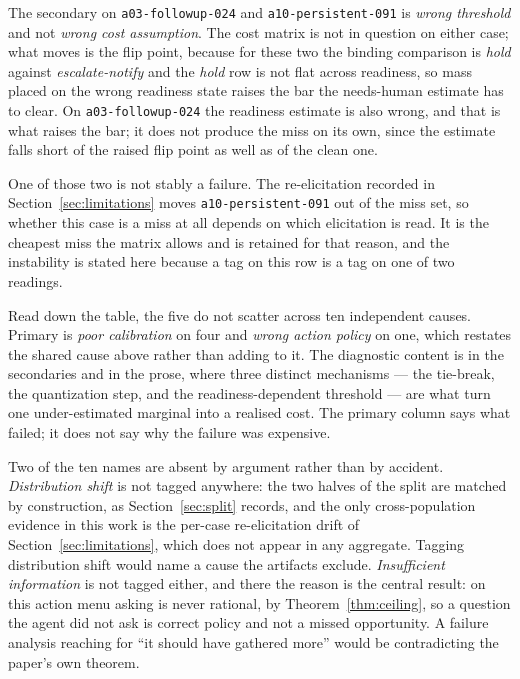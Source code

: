 \documentclass{article}
\begin{document}
The secondary on \texttt{a03-followup-024} and \texttt{a10-persistent-091} is
\emph{wrong threshold} and not \emph{wrong cost assumption}. The cost matrix is not
in question on either case; what moves is the flip point, because for these two the
binding comparison is \emph{hold} against \emph{escalate-notify} and the
\emph{hold} row is not flat across readiness, so mass placed on the wrong readiness
state raises the bar the needs-human estimate has to clear. On
\texttt{a03-followup-024} the readiness estimate is also wrong, and that is what
raises the bar; it does not produce the miss on its own, since the estimate falls
short of the raised flip point as well as of the clean one.

One of those two is not stably a failure. The re-elicitation recorded in
Section~\ref{sec:limitations} moves \texttt{a10-persistent-091} out of the miss
set, so whether this case is a miss at all depends on which elicitation is read. It
is the cheapest miss the matrix allows and is retained for that reason, and the
instability is stated here because a tag on this row is a tag on one of two
readings.

Read down the table, the five do not scatter across ten independent causes. Primary
is \emph{poor calibration} on four and \emph{wrong action policy} on one, which
restates the shared cause above rather than adding to it. The diagnostic content is
in the secondaries and in the prose, where three distinct mechanisms --- the
tie-break, the quantization step, and the readiness-dependent threshold --- are what
turn one under-estimated marginal into a realised cost. The primary column says what
failed; it does not say why the failure was expensive.

Two of the ten names are absent by argument rather than by accident.
\emph{Distribution shift} is not tagged anywhere: the two halves of the split are
matched by construction, as Section~\ref{sec:split} records, and the only
cross-population evidence in this work is the per-case re-elicitation drift of
Section~\ref{sec:limitations}, which does not appear in any aggregate. Tagging
distribution shift would name a cause the artifacts exclude.
\emph{Insufficient information} is not tagged either, and there the reason is the
central result: on this action menu asking is never rational, by
Theorem~\ref{thm:ceiling}, so a question the agent did not ask is correct policy and
not a missed opportunity. A failure analysis reaching for ``it should have gathered
more'' would be contradicting the paper's own theorem.
\end{document}

